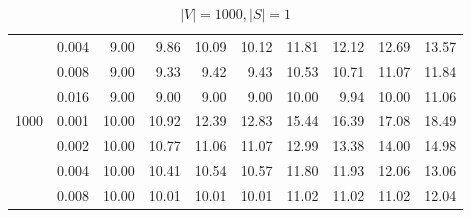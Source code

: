 \begin{table}[]
\begin{tabular}{rrrrrrrrrr}
& 0.004 & 9.00 & 9.86  & 10.09 & 10.12 & 11.81 & 12.12 & 12.69 & 13.57 \\
& 0.008 & 9.00 & 9.33  & 9.42  & 9.43  & 10.53 & 10.71 & 11.07 & 11.84 \\
& 0.016 & 9.00 & 9.00  & 9.00  & 9.00  & 10.00 & 9.94  & 10.00 & 11.06 \\
\hline
\multirow{5}{*}{1000} 
& 0.001 & 10.00 & 10.92 & 12.39 & 12.83 & 15.44 & 16.39 & 17.08 & 18.49 \\
& 0.002 & 10.00 & 10.77 & 11.06 & 11.07 & 12.99 & 13.38 & 14.00 & 14.98 \\
& 0.004 & 10.00 & 10.41 & 10.54 & 10.57 & 11.80 & 11.93 & 12.06 & 13.06 \\
& 0.008 & 10.00 & 10.01 & 10.01 & 10.01 & 11.02 & 11.02 & 11.02 & 12.04 \\
\end{tabular}
\caption{$|V|=1000, |S|=1$}
\label{tab:obj-s1}
\end{table}

